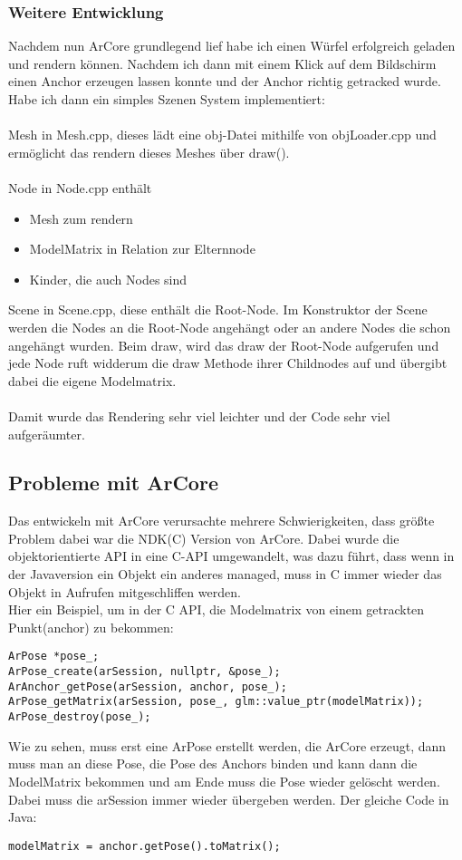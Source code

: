 \subsubsection{Weitere Entwicklung}
Nachdem nun ArCore grundlegend lief habe ich einen Würfel erfolgreich geladen und rendern können.
Nachdem ich dann mit einem Klick auf dem Bildschirm einen
Anchor erzeugen lassen konnte und der Anchor richtig getracked wurde.
Habe ich dann ein simples Szenen System implementiert:
\\ \\
Mesh in Mesh.cpp, dieses lädt eine obj-Datei mithilfe von objLoader.cpp und ermöglicht das rendern dieses Meshes über draw().
\\ \\
Node in Node.cpp enthält
\begin{itemize}
  \item Mesh zum rendern
  \item ModelMatrix in Relation zur Elternnode
  \item Kinder, die auch Nodes sind
\end{itemize}
Scene in Scene.cpp, diese enthält die Root-Node.
Im Konstruktor der Scene werden die Nodes an die Root-Node angehängt oder an andere Nodes die schon angehängt wurden. Beim draw, wird das draw der Root-Node aufgerufen und jede Node ruft widderum
die draw Methode ihrer Childnodes auf und übergibt dabei die eigene Modelmatrix.
\\ \\
Damit wurde das Rendering sehr viel leichter und der Code sehr viel aufgeräumter.

\subsection{Probleme mit ArCore}
Das entwickeln mit ArCore verursachte mehrere Schwierigkeiten, dass größte Problem dabei war
die NDK(C) Version von ArCore. Dabei wurde die objektorientierte API in eine C-API
umgewandelt, was dazu führt, dass wenn in der Javaversion  ein Objekt ein anderes managed,
muss in C immer wieder das Objekt in Aufrufen mitgeschliffen werden.
\\
Hier ein Beispiel, um in der C API, die Modelmatrix von einem getrackten Punkt(anchor) zu bekommen:
\begin{verbatim}
ArPose *pose_;
ArPose_create(arSession, nullptr, &pose_);
ArAnchor_getPose(arSession, anchor, pose_);
ArPose_getMatrix(arSession, pose_, glm::value_ptr(modelMatrix));
ArPose_destroy(pose_);
\end{verbatim}
Wie zu sehen, muss erst eine ArPose erstellt werden, die ArCore erzeugt, dann muss man an diese Pose, die Pose des Anchors binden und kann dann die ModelMatrix bekommen und am Ende muss die Pose wieder gelöscht werden. Dabei muss die arSession immer wieder übergeben werden.
Der gleiche Code in Java:
\begin{verbatim}
modelMatrix = anchor.getPose().toMatrix();
\end{verbatim}

